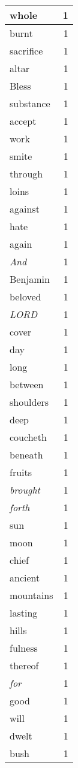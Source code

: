 \begin{center}
\begin{longtable}{l|r}
whole & 1 \\ \hline
burnt & 1 \\ \hline
sacrifice & 1 \\ \hline
altar & 1 \\ \hline
Bless & 1 \\ \hline
substance & 1 \\ \hline
accept & 1 \\ \hline
work & 1 \\ \hline
smite & 1 \\ \hline
through & 1 \\ \hline
loins & 1 \\ \hline
against & 1 \\ \hline
hate & 1 \\ \hline
again & 1 \\ \hline
\emph{And} & 1 \\ \hline
Benjamin & 1 \\ \hline
beloved & 1 \\ \hline
\emph{LORD} & 1 \\ \hline
cover & 1 \\ \hline
day & 1 \\ \hline
long & 1 \\ \hline
between & 1 \\ \hline
shoulders & 1 \\ \hline
deep & 1 \\ \hline
coucheth & 1 \\ \hline
beneath & 1 \\ \hline
fruits & 1 \\ \hline
\emph{brought} & 1 \\ \hline
\emph{forth} & 1 \\ \hline
sun & 1 \\ \hline
moon & 1 \\ \hline
chief & 1 \\ \hline
ancient & 1 \\ \hline
mountains & 1 \\ \hline
lasting & 1 \\ \hline
hills & 1 \\ \hline
fulness & 1 \\ \hline
thereof & 1 \\ \hline
\emph{for} & 1 \\ \hline
good & 1 \\ \hline
will & 1 \\ \hline
dwelt & 1 \\ \hline
bush & 1 \\ \hline

\end{longtable}
\end{center}

